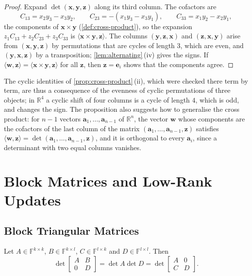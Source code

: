 \begin{proof}
Expand $\det(\mathbf x,\mathbf y,\mathbf z)$ along its third column. The cofactors are
\[
C_{13}=x_2y_3-x_3y_2,\qquad C_{23}=-(x_1y_3-x_3y_1),\qquad C_{33}=x_1y_2-x_2y_1,
\]
the components of $\mathbf x\times\mathbf y$ (\cref{def:cross-product}), so the expansion $z_1C_{13}+z_2C_{23}+z_3C_{33}$ is $\langle\mathbf x\times\mathbf y,\mathbf z\rangle$. The columns $(\mathbf y,\mathbf z,\mathbf x)$ and $(\mathbf z,\mathbf x,\mathbf y)$ arise from $(\mathbf x,\mathbf y,\mathbf z)$ by permutations that are cycles of length $3$, which are even, and $(\mathbf y,\mathbf x,\mathbf z)$ by a transposition; \cref{lem:alternating}\,(iv) gives the signs. If $\langle\mathbf w,\mathbf z\rangle=\langle\mathbf x\times\mathbf y,\mathbf z\rangle$ for all $\mathbf z$, then $\mathbf z=\mathbf e_i$ shows that the components agree.
\end{proof}

The cyclic identities of \cref{prop:cross-product}\,(ii), which were checked there term by term, are thus a consequence of the evenness of cyclic permutations of three objects; in $\mathbb R^4$ a cyclic shift of four columns is a cycle of length $4$, which is odd, and changes the sign. The proposition also suggests how to generalise the cross product: for $n-1$ vectors $\mathbf a_1,\ldots,\mathbf a_{n-1}$ of $\mathbb R^n$, the vector $\mathbf w$ whose components are the cofactors of the last column of the matrix $(\mathbf a_1,\ldots,\mathbf a_{n-1},\mathbf z)$ satisfies $\langle\mathbf w,\mathbf z\rangle=\det(\mathbf a_1,\ldots,\mathbf a_{n-1},\mathbf z)$, and it is orthogonal to every $\mathbf a_i$, since a determinant with two equal columns vanishes.

\section{Block Matrices and Low-Rank Updates}
\label{sec:det-block}

\subsection{Block Triangular Matrices}

\begin{theorem}
\label{thm:det-block-triangular}
Let $A\in\mathbb F^{k\times k}$, $B\in\mathbb F^{k\times l}$, $C\in\mathbb F^{l\times k}$ and $D\in\mathbb F^{l\times l}$. Then
\[
\det\begin{bmatrix}A&B\\0&D\end{bmatrix}=\det A\det D=\det\begin{bmatrix}A&0\\C&D\end{bmatrix}.
\]
\end{theorem}

